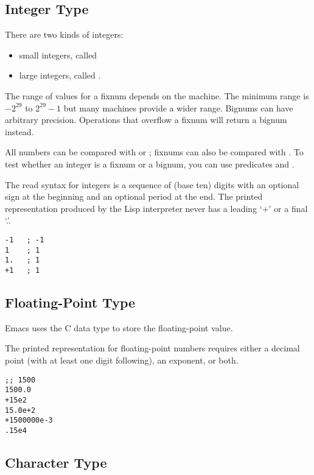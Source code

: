 \subsection{Integer Type}
\label{sec:integer-type}

There are two kinds of integers:
\begin{itemize}
\item small integers, called 
\item large integers, called .
\end{itemize}


The range of values for a fixnum depends on the machine.
The minimum range is \(-2^{29}\) to \(2^{29}-1\) but many machines provide a wider range.
Bignums can have arbitrary precision.
Operations that overflow a fixnum will return a bignum instead.


All numbers can be compared with  or \argument{=}; fixnums can also be compared with .
To test whether an integer is a fixnum or a bignum, you can use predicates  and .


The read syntax for integers is a sequence of (base ten) digits with an optional sign at the beginning and an optional period at the end.
The printed representation produced by the Lisp interpreter never has a leading ‘+’ or a final ‘.’.

\begin{lstlisting}
-1   ; -1
1    ; 1
1.   ; 1
+1   ; 1
\end{lstlisting}


\subsection{Floating-Point Type}
\label{sec:floating-point-type}

Emacs uses the C data type  to store the floating-point value.

The printed representation for floating-point numbers requires either a decimal point (with at least one digit following), an exponent, or both.
\begin{lstlisting}
;; 1500
1500.0
+15e2
15.0e+2
+1500000e-3
.15e4
\end{lstlisting}

\subsection{Character Type}
\label{sec:character-type}

